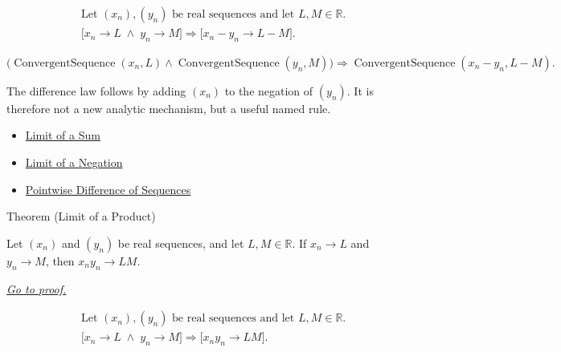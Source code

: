 \begin{remark*}
\[
\begin{aligned}
&\text{Let } (x_n),(y_n) \text{ be real sequences and let } L,M\in\mathbb{R}.\\
&\bigl[
x_n\to L \;\land\; y_n\to M
\bigr]
\Longrightarrow
\bigl[
x_n-y_n\to L-M
\bigr].
\end{aligned}
\]
\end{remark*}

\begin{remark*}
\[
\bigl(
\operatorname{ConvergentSequence}(x_n,L)
\land
\operatorname{ConvergentSequence}(y_n,M)
\bigr)
\Longrightarrow
\operatorname{ConvergentSequence}(x_n-y_n,L-M).
\]
\end{remark*}

\begin{remark*}[Interpretation]
The difference law follows by adding $(x_n)$ to the negation of $(y_n)$.
It is therefore not a new analytic mechanism, but a useful named rule.
\end{remark*}

\begin{dependencies}
\begin{itemize}
  \item \hyperref[thm:limit-of-a-sum]{Limit of a Sum}
  \item \hyperref[thm:limit-of-a-negation]{Limit of a Negation}
  \item \hyperref[def:pointwise-difference-sequence]{Pointwise Difference of Sequences}
\end{itemize}
\end{dependencies}


\begin{theorembox}{Theorem (Limit of a Product)}
\begin{theorem}
\label{thm:limit-of-a-product}
Let $(x_n)$ and $(y_n)$ be real sequences, and let $L,M\in\mathbb{R}$.
If $x_n\to L$ and $y_n\to M$, then $x_ny_n\to LM$.

\smallskip
\noindent
\hyperref[prf:limit-of-a-product]{\textit{Go to proof.}}
\end{theorem}
\end{theorembox}

\begin{remark*}
\[
\begin{aligned}
&\text{Let } (x_n),(y_n) \text{ be real sequences and let } L,M\in\mathbb{R}.\\
&\bigl[
x_n\to L \;\land\; y_n\to M
\bigr]
\Longrightarrow
\bigl[
x_ny_n\to LM
\bigr].
\end{aligned}
\]
\end{remark*}


